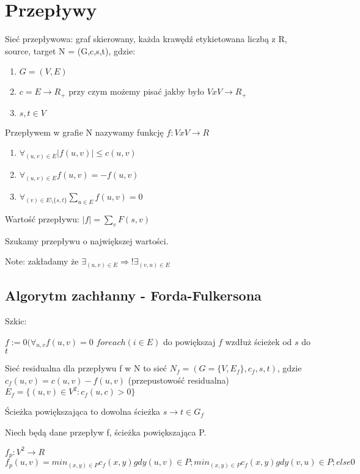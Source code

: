 \section{Przepływy}


Sieć przepływowa: graf skierowany, każda krawędź etykietowana liczbą z R, source, target
N = (G,c,s,t), gdzie:
\begin{enumerate}

\item $G = (V,E)$
\item $c = E \rightarrow R_+$ przy czym możemy pisać jakby było $VxV \rightarrow R_+$ 
\item $s,t \in V$
\end{enumerate}

Przepływem w grafie N nazywamy funkcję $f: VxV \rightarrow R$

\begin{enumerate}
\item $\forall_{(u,v) \in E} |f(u,v)| \le c(u,v)$
\item $\forall_{(u,v) \in E} f(u,v) =- f(u,v)$
\item $\forall_{(v) \in E\setminus \{s,t\}}  \sum_{u \in E} f(u,v) = 0$
\end{enumerate}

Wartość przepływu: $|f| = \sum_v F(s,v)$

Szukamy przepływu o największej wartości.

Note: zakładamy że $\exists_{(u,v) \in E} \Rightarrow !\exists_{(v,u) \in E} $

\subsection{Algorytm zachłanny - Forda-Fulkersona}
Szkic:

$f:= 0  (\forall_{u,v} f(u,v) = 0$
$foreach(i \in E)$ do
    powiększaj $f$ wzdłuż ścieżek od $s$ do $t$

Sieć residualna dla przepływu f w N to sieć $N_f = (G = \{V, E_f\}, c_f, s, t)$, gdzie
$c_f(u, v) = c(u,v) - f(u,v)$ (przepustowość residualna)
$E_f = \{ (u,v) \in V^2 : c_f(u,c) > 0 \}$

Ścieżka powiększająca to dowolna ścieżka $s \rightarrow t \in G_f$

Niech będą dane przepływ f, ścieżka powiększająca P.

$f_p: V^2 \rightarrow R$
$f_p(u,v) = min_{(x,y) \in P} c_f(x,y) gdy (u,v) \in P;min_{(x,y) \in P} c_f(x,y) gdy (v,u) \in P; else 0$

